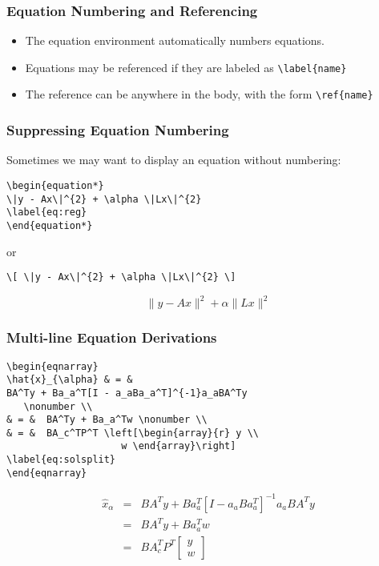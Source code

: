 \documentclass{beamer}
\begin{document}
\begin{frame}[fragile]
\frametitle{Equation Numbering and Referencing}
\begin{itemize}
	\item The equation environment automatically numbers equations.
	\item Equations may be referenced if they are labeled as \verb=\label{name}=
	\item The reference can be anywhere in the body, with the form \verb=\ref{name}=
\end{itemize}
\end{frame}

\begin{frame}[fragile]
\frametitle{Suppressing Equation Numbering}
Sometimes we may want to display an equation without numbering:
\begin{verbatim}
\begin{equation*}
\|y - Ax\|^{2} + \alpha \|Lx\|^{2}
\label{eq:reg}
\end{equation*}
\end{verbatim}
or
\begin{verbatim}
\[ \|y - Ax\|^{2} + \alpha \|Lx\|^{2} \]
\end{verbatim}
\[ \|y - Ax\|^{2} + \alpha \|Lx\|^{2} \]

\end{frame}

\begin{frame}[fragile]
\frametitle{Multi-line Equation Derivations}
\begin{verbatim}
\begin{eqnarray}
\hat{x}_{\alpha} & = &  
BA^Ty + Ba_a^T[I - a_aBa_a^T]^{-1}a_aBA^Ty
   \nonumber \\
& = &  BA^Ty + Ba_a^Tw \nonumber \\
& = &  BA_c^TP^T \left[\begin{array}{r} y \\ 
                    w \end{array}\right]
\label{eq:solsplit}
\end{eqnarray}
\end{verbatim}
\begin{eqnarray}
\hat{x}_{\alpha} & = &  
BA^Ty + Ba_a^T[I - a_aBa_a^T]^{-1}a_aBA^Ty
   \nonumber \\
& = &  BA^Ty + Ba_a^Tw \nonumber \\
& = &  BA_c^TP^T
   \left[\begin{array}{r} y \\ w \end{array}\right]
\label{eq:solsplit}
\end{eqnarray}
\end{frame}
\end{document}
